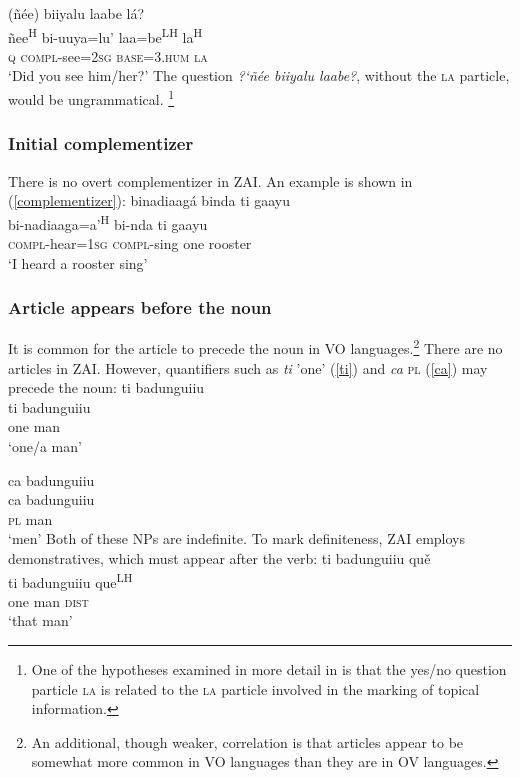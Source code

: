 \ea
{}(ñ\'{e}e) biiyalu laabe l\'{a}? \\
ñee\textsuperscript{H} bi-uuya=lu' laa=be\textsuperscript{LH} la\textsuperscript{H} \\
\textsc{q} \textsc{compl}-see=\textsc{2sg} \textsc{base}=\textsc{3.hum} \textsc{la} \\
\glt `Did you see him/her?'
\z
The question \textit{{?`}ñ\'{e}e biiyalu laabe?}, without the \textsc{la} particle, would be ungrammatical. \footnote{One of the hypotheses examined in more detail in  is that the yes/no question particle \textsc{la} is related to the \textsc{la} particle involved in the marking of topical information.}


\subsubsection{Initial complementizer}

There is no overt complementizer in ZAI. An example is shown in (\ref{complementizer}):
\ea\label{complementizer}
\glll binadiaag\'{a} binda ti gaayu \\
bi-nadiaaga=a'\textsuperscript{H} bi-nda ti gaayu \\
\textsc{compl}-hear=\textsc{1sg} \textsc{compl}-sing one rooster \\
\glt `I heard a rooster sing'
\z


\subsubsection{Article appears before the noun}

It is common for the article to precede the noun in VO languages.\footnote{An additional, though weaker, correlation is that articles appear to be somewhat more common in VO languages than they are in OV languages.} There are no articles in ZAI. However, quantifiers such as \textit{ti} 'one' (\ref{ti}) and \textit{ca} \textsc{pl} (\ref{ca}) may precede the noun:
\ea\label{ti}
\glll ti badunguiiu \\
ti badunguiiu \\
one man \\
\glt `one/a man'

\z

\ea\label{ca}
\glll ca badunguiiu \\
ca badunguiiu \\
\textsc{pl} man \\
\glt `men'
\z
Both of these NPs are indefinite. To mark definiteness, ZAI employs demonstratives, which must appear after the verb:
\ea\label{ti2}
\glll ti badunguiiu qu\v{e} \\
ti badunguiiu que\textsuperscript{LH} \\
one man \textsc{dist} \\
\glt `that man'
\z

